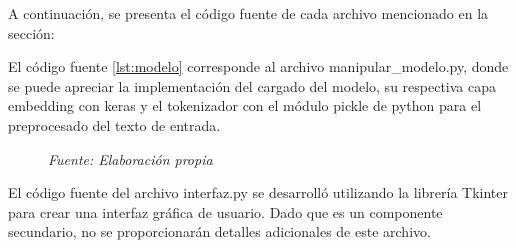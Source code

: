 A continuación, se presenta el código fuente de cada archivo mencionado en la sección:

El código fuente \ref{lst:modelo} corresponde al archivo manipular\_modelo.py, donde se puede apreciar la implementación del cargado del modelo, su respectiva capa embedding con keras y el tokenizador con el módulo pickle de python para el preprocesado del texto de entrada.


\vspace{-1.3em} %

\begin{figure}[h!]
	\centering %
	\textit{Fuente: Elaboración propia}
\end{figure}



El código fuente del archivo interfaz.py se desarrolló utilizando la librería Tkinter para crear una interfaz gráfica de usuario. Dado que es un componente secundario, no se proporcionarán detalles adicionales de este archivo.